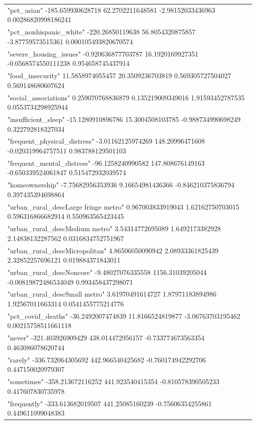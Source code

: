 \documentclass[
]{article}
\begin{document}
\begin{table}
\begin{tabular}[t]{l}
"pct\_asian" -185.659930628718 62.2702211648581 -2.98152033436963 0.00286820998186241\\
"pct\_nonhispanic\_white" -220.26850119638 56.8054320875857 -3.87759573515361 0.000105493820670574\\
"severe\_housing\_issues" -0.920636877703787 16.1920169927351 -0.0568574550111238 0.954658745437914\\
\addlinespace
"food\_insecurity" 11.5858974055457 20.3509236703819 0.569305727504027 0.569148680607624\\
"social\_associations" 0.259070768836879 0.135219009349016 1.91593452787535 0.0553734298925944\\
"insufficient\_sleep" -15.1280910896786 15.3004508103785 -0.988734990698249 0.322792818327034\\
"frequent\_physical\_distress" -3.01162125974269 148.20996471608 -0.020319964757511 0.983788129501103\\
"frequent\_mental\_distress" -96.1258240990582 147.808676149163 -0.650339524061847 0.515472932039574\\
\addlinespace
"homeownership" -7.75682956353936 9.16654981436366 -0.846210375836794 0.397435394698864\\
"urban\_rural\_descLarge fringe metro" 0.967003833919043 1.62162750703015 0.596316866682914 0.550963565423445\\
"urban\_rural\_descMedium metro" 3.54314772695089 1.6492173382928 2.14838132287562 0.0316834752751967\\
"urban\_rural\_descMicropolitan" 4.86506050090942 2.08933361825439 2.32852257696121 0.019884371843011\\
"urban\_rural\_descNoncore" -9.48027076335558 1156.31039205044 -0.00819872486534049 0.993458437298071\\
\addlinespace
"urban\_rural\_descSmall metro" 3.61970491614727 1.87971183894986 1.92567011663314 0.0541455775214776\\
"pct\_covid\_deaths" -36.2492007474839 11.8166524819877 -3.06763703195462 0.00215758511661118\\
"never" -321.403926909429 438.014472956157 -0.733774673563354 0.463086078620744\\
"rarely" -336.732064305692 442.966540425682 -0.760174942292706 0.447150020979307\\
"sometimes" -358.213672116252 441.923540415354 -0.810578390505233 0.417607830735978\\
\addlinespace
"frequently" -333.613682019507 441.25085160239 -0.75606354255861 0.449611099048383\\

\end{tabular}
\end{table}
\end{document}

